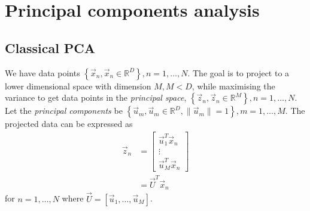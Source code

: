 \section{Principal components analysis}
\subsection{Classical PCA}
We have data points $\left\{\vec x_n, \vec x_n \in \mathbb R^D\right\}, n = 1, \dotsc, N$. The goal is to project to a lower dimensional space with dimension $M, M < D$, while maximising the variance to get data points in the \emph{principal space}, $\left\{\vec z_n, \vec z_n \in \mathbb R^M\right\}, n = 1, \dotsc, N$. Let the \emph{principal components} be $\left\{\vec u_m, \vec u_m \in \mathbb R^D, \| \vec u_m \| = 1\right\}, m = 1, \dotsc, M$. The projected data can be expressed as
\begin{align*}
    \vec z_n    &= 
        \begin{bmatrix}
            \vec u_1^T \vec x_n \\
            \vdots \\
            \vec u_M^T \vec x_n
        \end{bmatrix} \\
                &= \vec U^T \vec x_n
\end{align*}
for $n = 1, \dotsc, N$ where $\vec U = [\vec u_1, \dotsc, \vec u_M]$.

